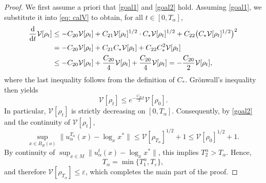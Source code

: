 \documentclass[11pt]{amsart}
\newcommand{\p}{o}%
\begin{document}
\begin{proof}
We first  assume a priori that \eqref{goal1} and \eqref{goal2} hold. Assuming \eqref{goal1}, we substitute it into \eqref{eq: calV} to obtain, for all $t \in [0, T_\alpha]$,
\begin{align*}
\frac{\mathrm{d}}{\mathrm{d} t}\mathcal{V}[\rho_t]
&\leq -C_{20}\mathcal{V}[\rho_t] 
   + C_{21}\mathcal{V}[\rho_t]^{1/2} \cdot C_* \mathcal{V}[\rho_t]^{1/2}
   + C_{22} \bigl(C_* \mathcal{V}[\rho_t]^{1/2}\bigr)^2 \notag\\
&= -C_{20}\mathcal{V}[\rho_t] + C_{21} C_* \mathcal{V}[\rho_t] + C_{22} C_*^2 \mathcal{V}[\rho_t] \notag\\
&\leq -C_{20}\mathcal{V}[\rho_t] + \frac{C_{20}}{4}\mathcal{V}[\rho_t] + \frac{C_{20}}{4}\mathcal{V}[\rho_t]
 = -\frac{C_{20}}{2}\mathcal{V}[\rho_t],
\end{align*}
where the last inequality follows from the definition of $C_*$. Grönwall’s inequality then yields
\begin{equation*}
   \mathcal{V}[\rho_t] \leq e^{-\frac{C_{20}}{2}t} \mathcal{V}[\rho_0].
\end{equation*}
In particular, $\mathcal{V}[\rho_t]$ is strictly decreasing on $[0, T_\alpha]$. Consequently, by \eqref{goal2} and the continuity of $\mathcal{V}[\rho_t]$,
\begin{equation*}
    \sup_{x\in B_R(\p)}\|u_\alpha^{T_\alpha}(x) - \log_x x^*\|
    \leq \mathcal{V}[\rho_{T_\alpha}]^{1/2} + 1
    \leq \mathcal{V}[\rho_0]^{1/2} + 1.
\end{equation*}
By continuity of $\sup_{x\in M}\|u_\alpha^t(x) - \log_x x^*\|$, this implies $T^\alpha_2 > T_\alpha$. Hence,
\[
T_\alpha = \min\{T^\alpha_1, T_\varepsilon\},
\]
and therefore $\mathcal{V}[\rho_{T_\alpha}] \leq \varepsilon$, which completes the main part of the proof.


\end{proof}
\end{document}
